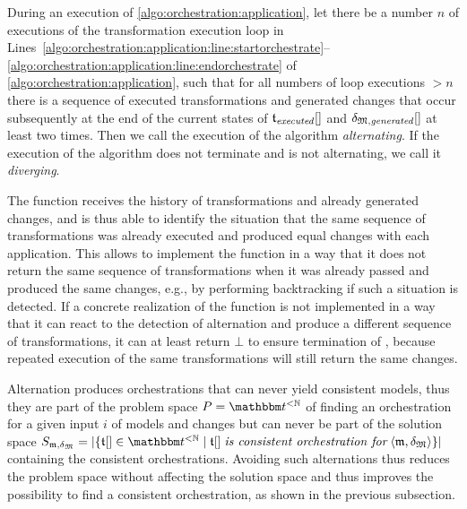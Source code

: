 \begin{definition}
    \label{def:applyalternation}
    During an execution of \autoref{algo:orchestration:application}, let there be a number $n$ of executions of the transformation execution loop in Lines~\ref{algo:orchestration:application:line:startorchestrate}--\ref{algo:orchestration:application:line:endorchestrate} of \autoref{algo:orchestration:application}, such that for all numbers of loop executions $> n$ there is a sequence of executed transformations and generated changes that occur subsequently at the end of the current states of $\applyalgexecuted$ and $\applyalggenerated$ at least two times.
    Then we call the execution of the algorithm \emph{alternating}.
    If the execution of the algorithm does not terminate and is not alternating, we call it \emph{diverging}.
\end{definition}

The  function receives the history of transformations and already generated changes, and is thus able to identify the situation that the same sequence of transformations was already executed and produced equal changes with each application.
This allows to implement the function in a way that it does not return the same sequence of transformations when it was already passed and produced the same changes, e.g., by performing backtracking if such a situation is detected.
If a concrete realization of the  function is not implemented in a way that it can react to the detection of alternation and produce a different sequence of transformations, it can at least return $\bot$ to ensure termination of , because repeated execution of the same transformations will still return the same changes. 

Alternation produces orchestrations that can never yield consistent models, thus they are part of the problem space $P = {\transformationset{T}^{< \mathbb{N}}}$ of finding an orchestration for a given input $i$ of models and changes but can never be part of the solution space $S_{\modeltuple{m}, \changetuple{\metamodeltuple{M}}} = \abs{\setted{\sequence{\transformation{t}} \in \transformationset{T}^{< \mathbb{N}} \mid \sequence{\transformation{t}} \mathtextspacearound{is consistent orchestration for} \tupled{\modeltuple{m}, \changetuple{\metamodeltuple{M}}}}}$ containing the consistent orchestrations.
Avoiding such alternations thus reduces the problem space without affecting the solution space and thus improves the possibility to find a consistent orchestration, as shown in the previous subsection.

